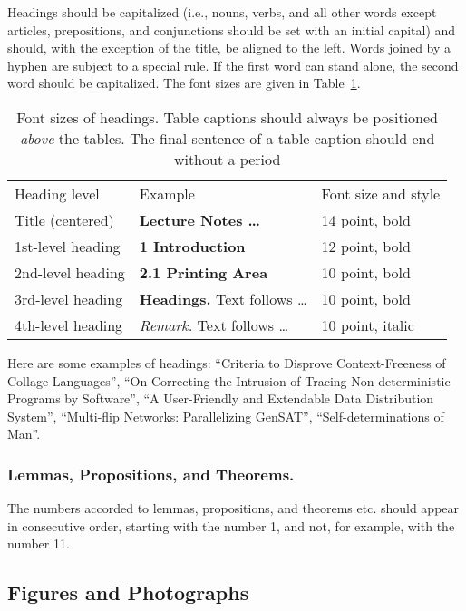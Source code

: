 \documentclass[runningheads]{llncs}
\begin{document}
Headings should be capitalized
(i.e., nouns, verbs, and all other words
except articles, prepositions, and conjunctions should be set with an
initial capital) and should,
with the exception of the title, be aligned to the left.
Words joined by a hyphen are subject to a special rule. If the first
word can stand alone, the second word should be capitalized.
The font sizes
are given in Table~\ref{table:headings}.
\setlength{\tabcolsep}{4pt}
\begin{table}
\begin{center}
\caption{Font sizes of headings. Table captions should always be
positioned {\it above} the tables. The final sentence of a table
caption should end without a period}
\label{table:headings}
\begin{tabular}{lll}
\hline\noalign{\smallskip}
Heading level & Example & Font size and style\\
\noalign{\smallskip}
\hline
\noalign{\smallskip}
Title (centered)  & {\Large \bf Lecture Notes \dots} & 14 point, bold\\
1st-level heading & {\large \bf 1 Introduction} & 12 point, bold\\
2nd-level heading & {\bf 2.1 Printing Area} & 10 point, bold\\
3rd-level heading & {\bf Headings.} Text follows \dots & 10 point, bold
\\
4th-level heading & {\it Remark.} Text follows \dots & 10 point,
italic\\
\hline
\end{tabular}
\end{center}
\end{table}
\setlength{\tabcolsep}{1.4pt}

Here are
some examples of headings: ``Criteria to Disprove Context-Freeness of
Collage Languages'', ``On Correcting the Intrusion of Tracing
Non-deterministic Programs by Software'', ``A User-Friendly and
Extendable Data Distribution System'', ``Multi-flip Networks:
Parallelizing GenSAT'', ``Self-determinations of Man''.

\subsubsection{Lemmas, Propositions, and Theorems.}

The numbers accorded to lemmas, propositions, and theorems etc. should
appear in consecutive order, starting with the number 1, and not, for
example, with the number 11.

\subsection{Figures and Photographs}
\label{sect:figures}
\end{document}

